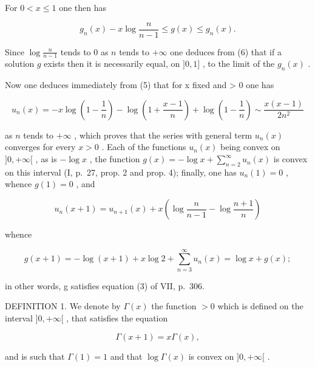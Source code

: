 For \(0 < x \leqslant 1\) one then has

\[
g _ {n} (x) - x \log \frac {n}{n - 1} \leqslant g (x) \leqslant g _ {n} (x).\tag{6}
\]

Since \(\log \frac{n}{n - 1}\) tends to 0 as \(n\) tends to \(+\infty\) one deduces from (6) that if a solution \(g\) exists then it is necessarily equal, on \(]0, 1]\) , to the limit of the \(g_n(x)\) .

Now one deduces immediately from (5) that for x fixed and \textgreater{} 0 one has

\[
u _ {n} (x) = - x \log \left(1 - \frac {1}{n}\right) - \log \left(1 + \frac {x - 1}{n}\right) + \log \left(1 - \frac {1}{n}\right) \sim \frac {x (x - 1)}{2 n ^ {2}}
\]

as \(n\) tends to \(+\infty\) , which proves that the series with general term \(u_{n}(x)\) converges for every \(x > 0\) . Each of the functions \(u_{n}(x)\) being convex on \(]0, +\infty[\) , as is \(-\log x\) , the function \(g(x) = -\log x + \sum_{n=2}^{\infty} u_{n}(x)\) is convex on this interval (I, p.~27, prop. 2 and prop. 4); finally, one has \(u_{n}(1) = 0\) , whence \(g(1) = 0\) , and

\[
u _ {n} (x + 1) = u _ {n + 1} (x) + x \left(\log \frac {n}{n - 1} - \log \frac {n + 1}{n}\right)
\]

whence

\[
g (x + 1) = - \log (x + 1) + x \log 2 + \sum_ {n = 3} ^ {\infty} u _ {n} (x) = \log x + g (x);
\]

in other words, g satisfies equation (3) of VII, p.~306.

DEFINITION 1. We denote by \(\Gamma(x)\) the function \(>0\) which is defined on the interval \(]0, +\infty[\) , that satisfies the equation

\[
\Gamma (x + 1) = x \Gamma (x),\tag{7}
\]

and is such that \(\Gamma(1) = 1\) and that \(\log \Gamma(x)\) is convex on \(]0, +\infty[\) .

